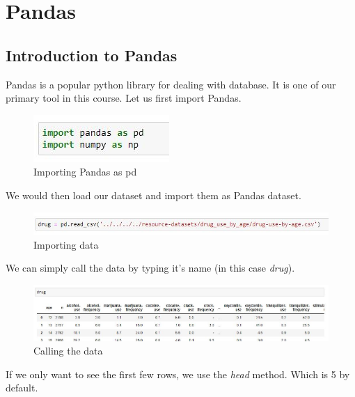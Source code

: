 \chapter{Pandas}
\section{Introduction to Pandas}
Pandas is a popular python library for dealing with database. It is one of our primary tool in this course. Let us first import Pandas.

\begin{figure}[ht]
	\centering
	\includegraphics{Assets/Images/Pandas/import}
	\caption{Importing Pandas as pd}
	\label{fig:import}
\end{figure}

\noindent We would then load our dataset and import them as Pandas dataset.

\begin{figure}[ht]
	\centering
	\includegraphics[width=1.0\linewidth]{"Assets/Images/Pandas/read data"}
	\caption{Importing data}
	\label{fig:read-data}
\end{figure}

\noindent We can simply call the data by typing it's name (in this case \textit{drug}).
\begin{figure}[ht]
	\centering
	\includegraphics[width=1\linewidth]{Assets/Images/Pandas/drugs}
	\caption{Calling the data}
	\label{fig:drugs}
\end{figure}

\noindent If we only want to see the first few rows, we use the \textit{head} method. Which is 5 by default.

